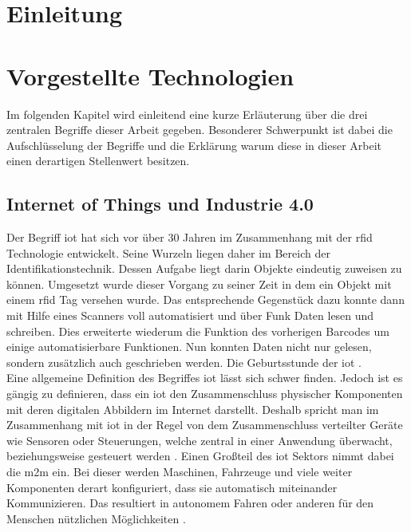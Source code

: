 \section{Einleitung}
\label{s:intro}

\section{Vorgestellte Technologien}
\label{s:grundlagen}

Im folgenden Kapitel wird einleitend eine kurze Erläuterung über die drei zentralen Begriffe dieser Arbeit gegeben. Besonderer Schwerpunkt ist dabei die Aufschlüsselung der Begriffe und die Erklärung warum diese in dieser Arbeit einen derartigen Stellenwert besitzen.\\ 

\subsection{Internet of Things und Industrie 4.0}
\label{ss:grundlagen:iot}

\noindent Der Begriff \ac{iot} hat sich vor über 30 Jahren im Zusammenhang mit der \ac{rfid} Technologie entwickelt. Seine Wurzeln liegen daher im Bereich der Identifikationstechnik. Dessen Aufgabe liegt darin Objekte eindeutig zuweisen zu können. Umgesetzt wurde dieser Vorgang zu seiner Zeit in dem ein Objekt mit einem \ac{rfid} Tag versehen wurde. Das entsprechende Gegenstück dazu konnte dann mit Hilfe eines Scanners voll automatisiert und über Funk Daten lesen und schreiben. Dies erweiterte wiederum die Funktion des vorherigen Barcodes um einige automatisierbare Funktionen. Nun konnten Daten nicht nur gelesen, sondern zusätzlich auch geschrieben werden. Die Geburtsstunde der \ac{iot} \cite[Seite 37]{Holtschulte20:IOS}.\\

\noindent Eine allgemeine Definition des Begriffes \ac{iot} lässt sich schwer finden. Jedoch ist es gängig zu definieren, dass ein \ac{iot} den Zusammenschluss physischer Komponenten mit deren digitalen Abbildern im Internet darstellt. Deshalb spricht man im Zusammenhang mit \ac{iot} in der Regel von dem Zusammenschluss verteilter Geräte wie Sensoren oder Steuerungen, welche zentral in einer Anwendung überwacht, beziehungsweise gesteuert werden \cite[Seite 33]{Holtschulte20:IOS}. Einen Großteil des \ac{iot} Sektors nimmt dabei die \ac{m2m} ein. Bei dieser werden Maschinen, Fahrzeuge und viele weiter Komponenten derart konfiguriert, dass sie automatisch miteinander Kommunizieren. Das resultiert in autonomem Fahren oder anderen für den Menschen nützlichen Möglichkeiten \cite[Seite 449]{Holtschulte20:IOS}.\\

